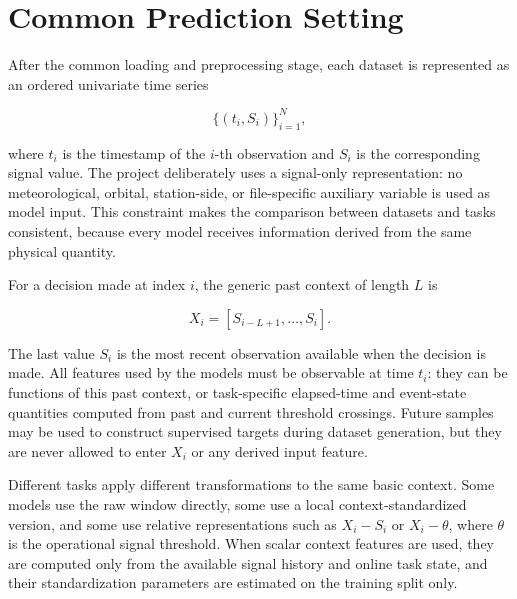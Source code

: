 \section{Common Prediction Setting}
\label{sec:common-prediction-setting}

After the common loading and preprocessing stage, each dataset is represented as
an ordered univariate time series

\[
  \{(t_i, S_i)\}_{i=1}^{N},
\]

where \(t_i\) is the timestamp of the \(i\)-th observation and \(S_i\) is the
corresponding signal value. The project deliberately uses a signal-only
representation: no meteorological, orbital, station-side, or file-specific
auxiliary variable is used as model input. This constraint makes the comparison
between datasets and tasks consistent, because every model receives information
derived from the same physical quantity.

For a decision made at index \(i\), the generic past context of length \(L\) is

\[
  X_i = [S_{i-L+1}, \ldots, S_i].
\]

The last value \(S_i\) is the most recent observation available when the
decision is made. All features used by the models must be observable at time
\(t_i\): they can be functions of this past context, or task-specific
elapsed-time and event-state quantities computed from past and current
threshold crossings. Future samples may be used to construct supervised targets
during dataset generation, but they are never allowed to enter \(X_i\) or any
derived input feature.

Different tasks apply different transformations to the same basic context. Some
models use the raw window directly, some use a local context-standardized
version, and some use relative representations such as \(X_i-S_i\) or
\(X_i-\theta\), where \(\theta\) is the operational signal threshold. When
scalar context features are used, they are computed only from the available
signal history and online task state, and their standardization parameters are
estimated on the training split only.

